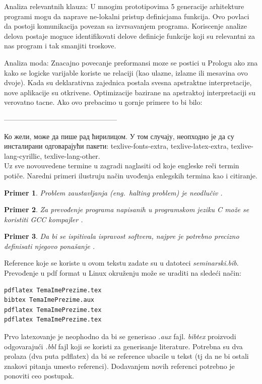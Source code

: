 \documentclass[a4paper]{article}
\newtheorem{primer}{Primer}[section]
\begin{document}
{Analiza relevantnih klauza:
U mnogim prototipovima 5 generacije arhitekture programi mogu da naprave ne-lokalni pristup definicjama funkcija. Ovo povlaci da postoji komunikacija povezan sa izvrsavanjem programa. Koriscenje analize delova postaje moguce identifikovati delove definicje funkcije koji su relevantni za nas program i tak smanjiti troskove.  

Analiza moda:
Znacajno povecanje preformansi moze se postici u Prologu ako zna kako se logicke varijable koriste ue relaciji (kao ulazne, izlazne ili mesavina ovo dvoje).
Kada su deklarativna zajednica postala svesna apstraktne interpretacije, nove aplikacije su otkrivene. Optimizacije bazirane na apstraktoj interpretaciji su verovatno tacne. Ako ovo prebacimo u gornje primere to bi bilo:







------------------------------------------------

Ко жели, може да пише рад ћирилицом. У том случају, неопходно је да су инсталирани одговарајући пакети: texlive-fonts-extra, texlive-latex-extra, texlive-lang-cyrillic, texlive-lang-other. \\

Uz sve novouvedene termine u zagradi naglasiti od koje engleske reči termin potiče. Naredni primeri ilustruju način uvođenja enlegskih termina kao i citiranje.

\begin{primer}
Problem zaustavljanja (eng.~{\em halting problem}) je neodlučiv \cite{haltingproblem}.
\end{primer}

\begin{primer}
Za prevođenje programa napisanih u programskom jeziku C može se koristiti GCC kompajler \cite{gcc}.
\end{primer}

\begin{primer}
 Da bi se ispitivala ispravost softvera, najpre je potrebno precizno definisati njegovo ponašanje \cite{laski2009software}. 
\end{primer}

Reference koje se koriste u ovom tekstu zadate su u datoteci {\em seminarski.bib}. Prevođenje u pdf format u Linux okruženju može se uraditi na sledeći način:
\begin{verbatim}
pdflatex TemaImePrezime.tex 
bibtex TemaImePrezime.aux 
pdflatex TemaImePrezime.tex 
pdflatex TemaImePrezime.tex 
\end{verbatim}
Prvo latexovanje je neophodno da bi se generisao {\em .aux} fajl. {\em bibtex} proizvodi odgovarajući {\em .bbl} fajl koji se koristi za generisanje literature. 
Potrebna su dva prolaza (dva puta pdflatex) da bi se reference ubacile u tekst (tj da ne bi ostali znakovi pitanja umesto referenci). Dodavanjem novih referenci potrebno je ponoviti ceo postupak.  


}
\end{document}
